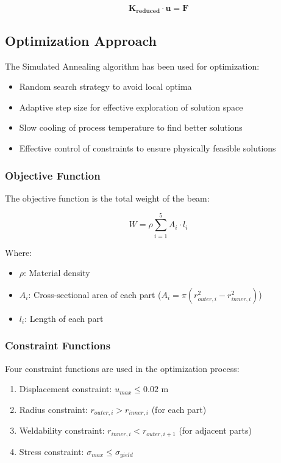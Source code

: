 \begin{equation}
\mathbf{K_{reduced}} \cdot \mathbf{u} = \mathbf{F}
\end{equation}

\subsection{Optimization Approach}
The Simulated Annealing algorithm has been used for optimization:

\begin{itemize}
    \item Random search strategy to avoid local optima
    \item Adaptive step size for effective exploration of solution space
    \item Slow cooling of process temperature to find better solutions
    \item Effective control of constraints to ensure physically feasible solutions
\end{itemize}

\subsubsection{Objective Function}
The objective function is the total weight of the beam:

\begin{equation}
W = \rho \sum_{i=1}^{5} A_i \cdot l_i
\end{equation}

Where:
\begin{itemize}
    \item $\rho$: Material density
    \item $A_i$: Cross-sectional area of each part ($A_i = \pi(r_{outer,i}^2 - r_{inner,i}^2)$)
    \item $l_i$: Length of each part
\end{itemize}

\subsubsection{Constraint Functions}
Four constraint functions are used in the optimization process:

\begin{enumerate}
    \item Displacement constraint: $u_{max} \leq 0.02$ m
    \item Radius constraint: $r_{outer,i} > r_{inner,i}$ (for each part)
    \item Weldability constraint: $r_{inner,i} < r_{outer,i+1}$ (for adjacent parts)
    \item Stress constraint: $\sigma_{max} \leq \sigma_{yield}$
\end{enumerate}


